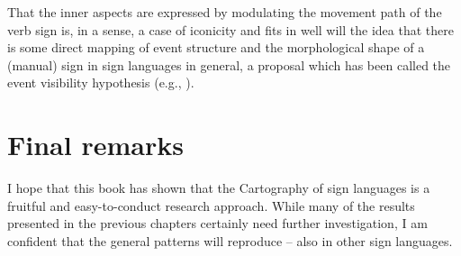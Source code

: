 That the inner aspects are expressed by modulating the movement path of the verb sign is, in a sense, a case of iconicity and fits in well will the idea that there is some direct mapping of event structure and the morphological shape of a (manual) sign in sign languages in general, a proposal which has been called the event visibility hypothesis (e.g., \citealt{wilbur2004event, wilbur2008complex, grose2007events}).





\section{Final remarks}
I hope that this book has shown that the Cartography of sign languages is a fruitful and easy-to-conduct research approach. While many of the results presented in the previous chapters certainly need further investigation, I am confident that the general patterns will reproduce -- also in other sign languages. 



